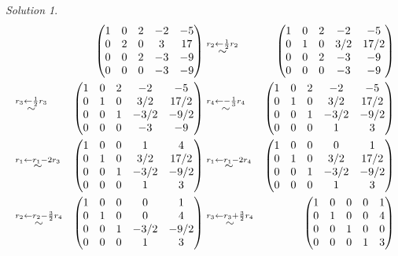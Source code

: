 \documentclass[
]{book}
\theoremstyle{definition}
\theoremstyle{definition}
\theoremstyle{definition}
\theoremstyle{definition}
\theoremstyle{remark}
\newtheorem*{solution}{Solution}
\begin{document}
\begin{solution}
\[
\begin{aligned}
& & \begin{pmatrix} 1 & 0 & 2 & -2 & -5 \\ 0 & 2 & 0 & 3 & 17 \\ 0 & 0 & 2 & -3 & -9 \\ 0 & 0 & 0 & -3 & -9 \end{pmatrix} & \stackrel{r_2 \leftarrow \frac{1}{2} r_2}{\huge \sim} & \begin{pmatrix} 1 & 0 & 2 & -2 & -5 \\ 0 & 1 & 0 & 3/2 & 17/2 \\ 0 & 0 & 2 & -3 & -9 \\ 0 & 0 & 0 & -3 & -9 \end{pmatrix} \\
& \stackrel{r_3 \leftarrow \frac{1}{2} r_3}{\huge \sim} & \begin{pmatrix} 1 & 0 & 2 & -2 & -5 \\ 0 & 1 & 0 & 3/2 & 17/2 \\ 0 & 0 & 1 & -3/2 & -9/2 \\ 0 & 0 & 0 & -3 & -9 \end{pmatrix} & \stackrel{r_4 \leftarrow - \frac{1}{3} r_4}{\huge \sim} & \begin{pmatrix} 1 & 0 & 2 & -2 & -5 \\ 0 & 1 & 0 & 3/2 & 17/2 \\ 0 & 0 & 1 & -3/2 & -9/2 \\ 0 & 0 & 0 & 1 & 3 \end{pmatrix} \\
& \stackrel{r_1 \leftarrow r_1 -2  r_3}{\huge \sim} & \begin{pmatrix} 1 & 0 & 0 & 1 & 4 \\ 0 & 1 & 0 & 3/2 & 17/2 \\ 0 & 0 & 1 & -3/2 & -9/2 \\ 0 & 0 & 0 & 1 & 3 \end{pmatrix} & \stackrel{r_1 \leftarrow r_1 - 2 r_4}{\huge \sim} & \begin{pmatrix} 1 & 0 & 0 & 0 & 1 \\ 0 & 1 & 0 & 3/2 & 17/2 \\ 0 & 0 & 1 & -3/2 & -9/2 \\ 0 & 0 & 0 & 1 & 3 \end{pmatrix} \\
& \stackrel{r_2 \leftarrow r_2 - \frac{3}{2} r_4}{\huge \sim} & \begin{pmatrix} 1 & 0 & 0 & 0 & 1 \\ 0 & 1 & 0 & 0 & 4 \\ 0 & 0 & 1 & -3/2 & -9/2 \\ 0 & 0 & 0 & 1 & 3 \end{pmatrix} & 
\stackrel{r_3 \leftarrow r_3 + \frac{3}{2} r_4}{\huge \sim} & \begin{pmatrix} 1 & 0 & 0 & 0 & 1 \\ 0 & 1 & 0 & 0 & 4 \\ 0 & 0 & 1 & 0 & 0 \\ 0 & 0 & 0 & 1 & 3 \end{pmatrix} 
\end{aligned}
\]


\end{solution}
\end{document}
